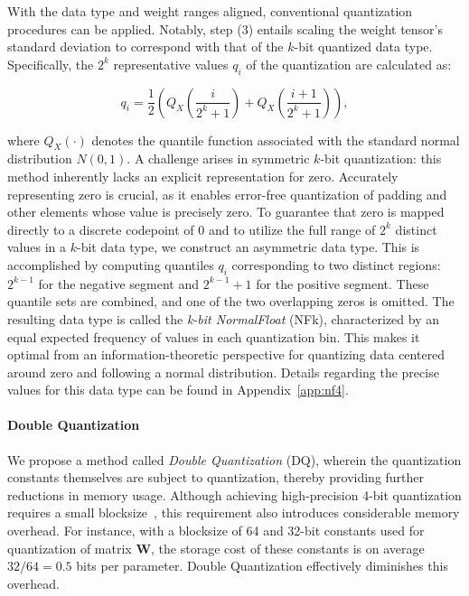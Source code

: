 With the data type and weight ranges aligned, conventional quantization procedures can be applied. Notably, step (3) entails scaling the weight tensor's standard deviation to correspond with that of the $k$-bit quantized data type. Specifically, the $2^k$ representative values $q_i$ of the quantization are calculated as:

\begin{equation}
q_i  = \frac{1}{2}\left( Q_X\left(\frac{i}{2^k+1}\right) + Q_X\left(\frac{i+1}{2^k+1}\right)\right),
\end{equation}

where $Q_X(\cdot)$ denotes the quantile function associated with the standard normal distribution $N(0,1)$. A challenge arises in symmetric $k$-bit quantization: this method inherently lacks an explicit representation for zero. Accurately representing zero is crucial, as it enables error-free quantization of padding and other elements whose value is precisely zero. To guarantee that zero is mapped directly to a discrete codepoint of $0$ and to utilize the full range of $2^k$ distinct values in a $k$-bit data type, we construct an asymmetric data type. This is accomplished by computing quantiles $q_i$ corresponding to two distinct regions: $2^{k-1}$ for the negative segment and $2^{k-1}+1$ for the positive segment. These quantile sets are combined, and one of the two overlapping zeros is omitted. The resulting data type is called the \emph{k-bit NormalFloat} (NFk), characterized by an equal expected frequency of values in each quantization bin. This makes it optimal from an information-theoretic perspective for quantizing data centered around zero and following a normal distribution. Details regarding the precise values for this data type can be found in Appendix~\ref{app:nf4}.

\paragraph{Double Quantization{}}
We propose a method called \emph{Double Quantization} (DQ), wherein the quantization constants themselves are subject to quantization, thereby providing further reductions in memory usage. Although achieving high-precision 4-bit quantization requires a small blocksize~\citep{dettmers2022case}, this requirement also introduces considerable memory overhead. For instance, with a blocksize of 64 and 32-bit constants used for quantization of matrix $\mathbf{W}$, the storage cost of these constants is on average $32/64 = 0.5$ bits per parameter. Double Quantization effectively diminishes this overhead.

